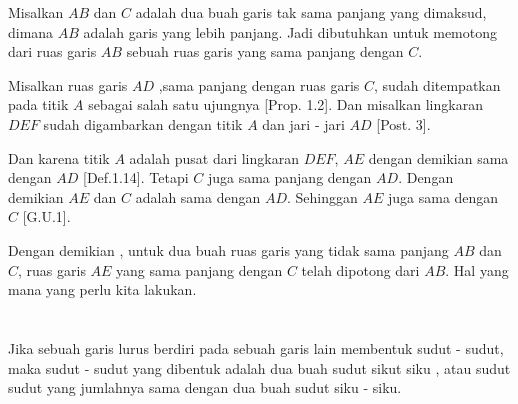 \documentclass[a4paper, 12pt]{book}
\begin{document}

Misalkan $AB$ dan $C$ adalah dua buah garis tak sama panjang yang dimaksud,
dimana $AB$ adalah garis yang lebih panjang. Jadi dibutuhkan untuk memotong
dari ruas garis $AB$ sebuah ruas garis yang sama panjang dengan $C$.

Misalkan ruas garis $AD$ ,sama panjang dengan ruas garis $C$, sudah ditempatkan
pada titik $A$ sebagai salah satu ujungnya [Prop. 1.2]. Dan misalkan lingkaran
$DEF$ sudah digambarkan dengan titik $A$ dan jari - jari $AD$ [Post. 3].

Dan karena titik $A$ adalah pusat dari lingkaran $DEF$, $AE$ dengan demikian
sama dengan $AD$ [Def.1.14]. Tetapi $C$ juga sama panjang dengan $AD$. Dengan 
demikian $AE$ dan $C$ adalah sama dengan $AD$. Sehinggan $AE$ juga sama dengan
$C$ [G.U.1].

Dengan demikian , untuk dua buah ruas garis yang tidak sama panjang $AB$ 
dan $C$, ruas garis $AE$ yang sama panjang dengan $C$ telah dipotong dari 
$AB$. Hal yang mana yang perlu kita lakukan.

\setcounter{section}{13}
\section*{\centering \thesection} 
Jika sebuah garis lurus berdiri pada sebuah garis lain membentuk sudut - sudut, maka
sudut - sudut yang dibentuk adalah dua buah sudut sikut siku , atau sudut sudut yang
jumlahnya sama dengan dua buah sudut siku - siku.
\end{document}
